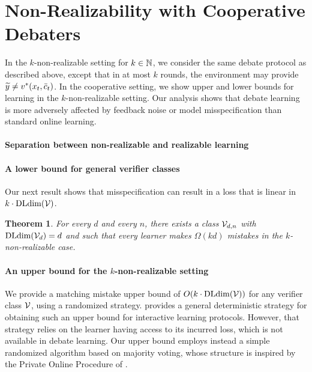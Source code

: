\documentclass[11pt,letterpaper]{article}
\newtheorem{theorem}{Theorem}
\theoremstyle{definition}
\theoremstyle{plain}
\begin{document}
\fi

\section{Non-Realizability with Cooperative Debaters}

In the $k$-non-realizable setting for $k \in \mathbb{N}$, we consider the same debate protocol as described above, except that in at most $k$ rounds, the environment may provide ${\widetilde{y}} \neq v^*(x_t, \bar{c}_t)$. In the cooperative setting, we show upper and lower bounds for learning in the $k$-non-realizable setting. Our analysis shows that debate learning is more adversely affected by feedback noise or model misspecification than standard online learning.

\paragraph{Separation between non-realizable and realizable learning}
\label{sec:agnostic-example}





\paragraph{A lower bound for general verifier classes}
Our next result shows that %
misspecification can result in a loss that is linear in $k\cdot \mathrm{DLdim}({\mathcal V})$.
\begin{theorem}\label{thm:kdlower}
    For every $d$ and every $n$, there exists a class ${\mathcal V}_{d,n}$ with $\mathrm{DLdim}({\mathcal V}_d)=d$ and such that every %
    learner makes $\Omega(kd)$ mistakes in the $k$-non-realizable case.
\end{theorem}

\paragraph{An upper bound for the $k$-non-realizable setting}
We provide a matching mistake upper bound of $O(k\cdot \mathrm{DLdim}({\mathcal V}))$ for any verifier class ${\mathcal V}$, using a randomized strategy. \cite{oz2026discriminative} provides a general deterministic strategy for obtaining such an upper bound for interactive learning protocols. However, that strategy relies on the learner having access to its incurred loss, which is not available in debate learning. 
Our upper bound employs instead a simple randomized algorithm based on majority voting, whose structure is inspired by the Private Online Procedure of \cite{kaplan2023black}. 
\end{document}
